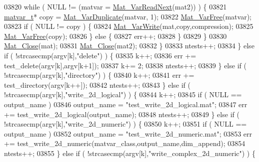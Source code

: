 \begin{DoxyCode}
{{{{{{{{{{{{{{{{{{{{{{{{{{{{{{{{{{{{{{{{{{{{{{{{{{{{{{{{{{{{{{{{{{{{03820                 \textcolor{keywordflow}{while} ( NULL != (matvar = \hyperlink{group___m_a_t_ga7c321d6aafd93916ba6c5655ad78e9ca}{Mat\_VarReadNext}(mat2)) ) \{
03821                     \hyperlink{group___m_a_t_structmatvar__t}{matvar\_t}* copy = \hyperlink{group___m_a_t_ga7ef80c5d99d7918b2b09db3bea106ecc}{Mat\_VarDuplicate}(matvar, 1);
03822                     \hyperlink{group___m_a_t_ga1d14716f7450530fd1c9d02413787f0e}{Mat\_VarFree}(matvar);
03823                     \textcolor{keywordflow}{if} ( NULL != copy ) \{
03824                         \hyperlink{group___m_a_t_ga4bd3eba12df415d8226e27c457fbbb0b}{Mat\_VarWrite}(mat,copy,compression);
03825                         \hyperlink{group___m_a_t_ga1d14716f7450530fd1c9d02413787f0e}{Mat\_VarFree}(copy);
03826                     \} \textcolor{keywordflow}{else} \{
03827                         err++;
03828                     \}
03829                 \}
03830                 \hyperlink{group___m_a_t_ga101c92ff7bde4a2d4615661beba09262}{Mat\_Close}(mat);
03831                 \hyperlink{group___m_a_t_ga101c92ff7bde4a2d4615661beba09262}{Mat\_Close}(mat2);
03832             \}
03833             ntests++;
03834         \} \textcolor{keywordflow}{else} \textcolor{keywordflow}{if} ( !strcasecmp(argv[k],\textcolor{stringliteral}{"delete"}) ) \{
03835             k++;
03836             err += test\_delete(argv[k],argv[k+1]);
03837             k+= 2;
03838             ntests++;
03839         \} \textcolor{keywordflow}{else} \textcolor{keywordflow}{if} ( !strcasecmp(argv[k],\textcolor{stringliteral}{"directory"}) ) \{
03840             k++;
03841             err += test\_directory(argv[k++]);
03842             ntests++;
03843         \} \textcolor{keywordflow}{else} \textcolor{keywordflow}{if} ( !strcasecmp(argv[k],\textcolor{stringliteral}{"write\_2d\_logical"}) ) \{
03844             k++;
03845             \textcolor{keywordflow}{if} ( NULL == output\_name )
03846                 output\_name = \textcolor{stringliteral}{"test\_write\_2d\_logical.mat"};
03847             err += test\_write\_2d\_logical(output\_name);
03848             ntests++;
03849         \} \textcolor{keywordflow}{else} \textcolor{keywordflow}{if} ( !strcasecmp(argv[k],\textcolor{stringliteral}{"write\_2d\_numeric"}) ) \{
03850             k++;
03851             \textcolor{keywordflow}{if} ( NULL == output\_name )
03852                 output\_name = \textcolor{stringliteral}{"test\_write\_2d\_numeric.mat"};
03853             err += test\_write\_2d\_numeric(matvar\_class,output\_name,dim\_append);
03854             ntests++;
03855         \} \textcolor{keywordflow}{else} \textcolor{keywordflow}{if} ( !strcasecmp(argv[k],\textcolor{stringliteral}{"write\_complex\_2d\_numeric"}) ) \{
}}}}}}}}}}}}}}}}}}}}}}}}}}}}}}}}}}}}}}}}}}}}}}}}}}}}}}}}}}}}}}}}}}}}
\end{DoxyCode}

